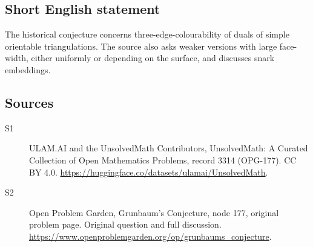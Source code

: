 \documentclass[11pt]{article}
\begin{document}
\subsection{Short English statement}
The historical conjecture concerns three-edge-colourability of duals of simple orientable triangulations. The source also asks weaker versions with large face-width, either uniformly or depending on the surface, and discusses snark embeddings.
\subsection{Sources}
\begin{description}
\item[\hypertarget{source:3314:1}{S1}] ULAM.AI and the UnsolvedMath Contributors, UnsolvedMath: A Curated Collection of Open Mathematics Problems, record 3314 (OPG-177). CC BY 4.0. \url{https://huggingface.co/datasets/ulamai/UnsolvedMath}.
\item[\hypertarget{source:3314:2}{S2}] Open Problem Garden, Grunbaum's Conjecture, node 177, original problem page. Original question and full discussion. \url{https://www.openproblemgarden.org/op/grunbaums_conjecture}.

\end{description}
\label{end:3314}
\end{document}
